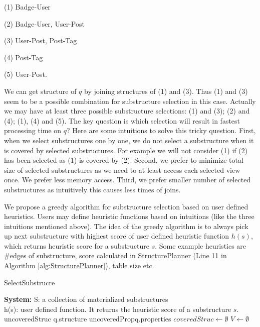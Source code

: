 (1) Badge-User

(2) Badge-User, User-Post

(3) User-Post, Post-Tag

(4) Post-Tag

(5) User-Post.

We can get structure of $q$ by joining structures of (1) and (3). Thus (1) and (3) seem to be a possible combination for substructure selection in this case. Actually we may have at least three possible substructure selections: (1) and (3); (2) and (4);
(1), (4) and (5). The key question is which selection will result in fastest processing time on $q$? Here are some intuitions to solve this tricky question. First, when we select substructures one by one, we do not select a substructure when it is covered by selected substructures. For example we will not consider (1) if (2) has been selected as (1) is covered by (2). Second, we prefer to minimize total size of selected substructures as we need to at least access each selected view once. We prefer less memory access. Third, we prefer smaller number of selected substructures as intuitively this causes less times of joins.

We propose a greedy algorithm for substructure selection based on user defined heuristics. Users may define heuristic functions based on intuitions (like the three intuitions mentioned above). The idea of the greedy algorithm is to always pick up next substructure with highest score of user defined heuristic function $h(s)$, which returns heuristic score for a substructure $s$. Some example heuristics are \#edges of substructure, score calculated in StructurePlanner (Line 11 in Algorithm \ref{alg:StructurePlanner}), table size etc.

\begin{algorithm}[H]
\caption{SelectSubstrucre}
\label{alg:SelectSubstrucre}
\LinesNumbered
\textbf{System:} S: a collection of materialized substructures\\ h(s): user defined function. It returns the heuristic score of a substructure $s$.\\
uncoveredStruc \leftarrow q.structure\;
uncoveredProp\leftarrow q.properties\;
$coveredStruc\leftarrow \emptyset$\;
$V\leftarrow\emptyset $\;
\end{algorithm}


